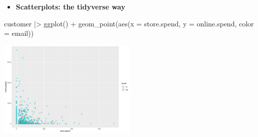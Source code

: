 \documentclass[
  ignorenonframetext,
]{beamer}
\newenvironment{Shaded}{\begin{snugshade}}{\end{snugshade}}
\newcommand{\AttributeTok}[1]{\textcolor[rgb]{0.40,0.45,0.13}{#1}}
\newcommand{\FunctionTok}[1]{\textcolor[rgb]{0.28,0.35,0.67}{#1}}
\newcommand{\NormalTok}[1]{\textcolor[rgb]{0.00,0.23,0.31}{#1}}
\newcommand{\SpecialCharTok}[1]{\textcolor[rgb]{0.37,0.37,0.37}{#1}}
\providecommand{\tightlist}{%
  \setlength{\itemsep}{0pt}\setlength{\parskip}{0pt}}\usepackage{longtable,booktabs,array}
\begin{document}
\begin{frame}[fragile]{}
\label{section-13}
\begin{itemize}
\tightlist
\item
  \textbf{Scatterplots: the tidyverse way}
\end{itemize}

\tiny

\begin{Shaded}
\begin{Highlighting}[]
\NormalTok{customer }\SpecialCharTok{|\textgreater{}} \FunctionTok{ggplot}\NormalTok{() }\SpecialCharTok{+}
  \FunctionTok{geom\_point}\NormalTok{(}\FunctionTok{aes}\NormalTok{(}\AttributeTok{x =}\NormalTok{ store.spend, }\AttributeTok{y =}\NormalTok{ online.spend, }\AttributeTok{color =}\NormalTok{ email))}
\end{Highlighting}
\end{Shaded}

\begin{center}
\includegraphics[width=0.5\textwidth,height=\textheight]{004_relationships_between_continuous_variables_files/figure-beamer/unnamed-chunk-11-1.pdf}
\end{center}
\end{frame}
\end{document}
